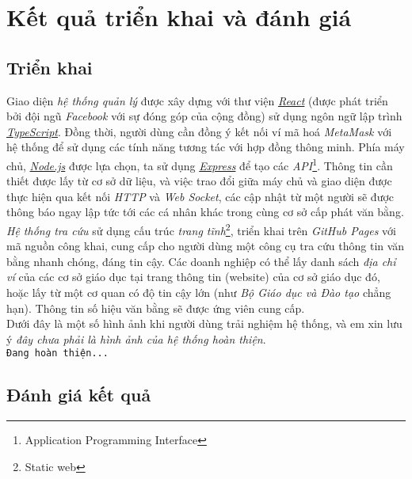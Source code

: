 \newpage
\section{Kết quả triển khai và đánh giá}

\subsection*{Triển khai}

Giao diện \textit{hệ thống quản lý} được xây dựng với thư viện \href{https://reactjs.org}{\textit{React}} (được phát triển bởi đội ngũ \textit{Facebook} với sự đóng góp của cộng đồng) sử dụng ngôn ngữ lập trình \href{https://www.typescriptlang.org/}{\textit{TypeScript}}. Đồng thời, người dùng cần đồng ý kết nối ví mã hoá \textit{MetaMask} với hệ thống để sử dụng các tính năng tương tác với hợp đồng thông minh. Phía máy chủ, \href{https://nodejs.org}{\textit{Node.js}} được lựa chọn, ta sử dụng \href{https://expressjs.com/}{\textit{Express}} để tạo các \textit{API}\footnote{Application Programming Interface}. Thông tin cần thiết được lấy từ cơ sở dữ liệu, và việc trao đổi giữa máy chủ và giao diện được thực hiện qua kết nối \textit{HTTP} và \textit{Web Socket}, các cập nhật từ một người sẽ được thông báo ngay lập tức tới các cá nhân khác trong cùng cơ sở cấp phát văn bằng.\\

\textit{Hệ thống tra cứu} sử dụng cấu trúc \textit{trang tĩnh}\footnote{Static web}, triển khai trên \textit{GitHub Pages} với mã nguồn công khai, cung cấp cho người dùng một công cụ tra cứu thông tin văn bằng nhanh chóng, đáng tin cậy. Các doanh nghiệp có thể lấy danh sách \textit{địa chỉ ví} của các cơ sở giáo dục tại trang thông tin (website) của cơ sở giáo dục đó, hoặc lấy từ một cơ quan có độ tin cậy lớn (như \textit{Bộ Giáo dục và Đào tạo} chẳng hạn). Thông tin số hiệu văn bằng sẽ được ứng viên cung cấp.\\

Dưới đây là một số hình ảnh khi người dùng trải nghiệm hệ thống, và em xin lưu ý \textit{đây chưa phải là hình ảnh của hệ thống hoàn thiện}.\\

\texttt{Đang hoàn thiện...}

\subsection*{Đánh giá kết quả}

